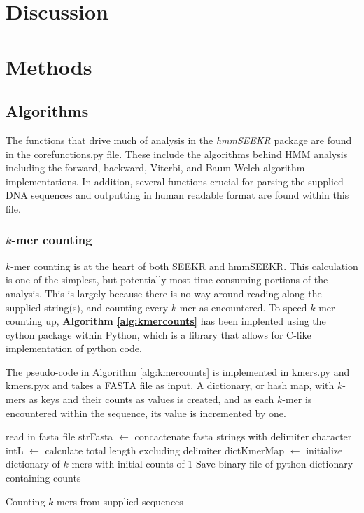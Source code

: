 \section{Discussion}
\lipsum[1-2]
\section{Methods}
\subsection{Algorithms}
The functions that drive much of analysis in the \emph{hmmSEEKR} package are found in the corefunctions.py file. These include the algorithms behind HMM analysis including the forward, backward, Viterbi, and Baum-Welch algorithm implementations. In addition, several functions crucial for parsing the supplied DNA sequences and outputting in human readable format are found within this file.

\subsubsection{$k$-mer counting}
$k$-mer counting is at the heart of both SEEKR and hmmSEEKR. This calculation is one of the simplest, but potentially most time consuming portions of the analysis. This is largely because there is no way around reading along the supplied string(s), and counting every $k$-mer as encountered. To speed $k$-mer counting up, \textbf{Algorithm \ref{alg:kmercounts}} has been implented using the cython package within Python, which is a library that allows for C-like implementation of python code.

The pseudo-code in Algorithm \ref{alg:kmercounts} is implemented in kmers.py and kmers.pyx and takes a FASTA file as input. A dictionary, or hash map, with $k$-mers as keys and their counts as values is created, and as each $k$-mer is encountered within the sequence, its value is incremented by one.

\begin{algorithm}[h]
\DontPrintSemicolon
{}
\SetAlgoLined
{}
 read in fasta file\;
 strFasta $\leftarrow$ concactenate fasta strings with delimiter character\;
 intL $\leftarrow$ calculate total length excluding delimiter\;
 dictKmerMap $\leftarrow$ initialize dictionary of $k$-mers with initial counts of 1\;
 Save binary file of python dictionary containing counts
 \caption{Counting $k$-mers from supplied sequences}
 \label{alg:kmercounts}
\end{algorithm}

